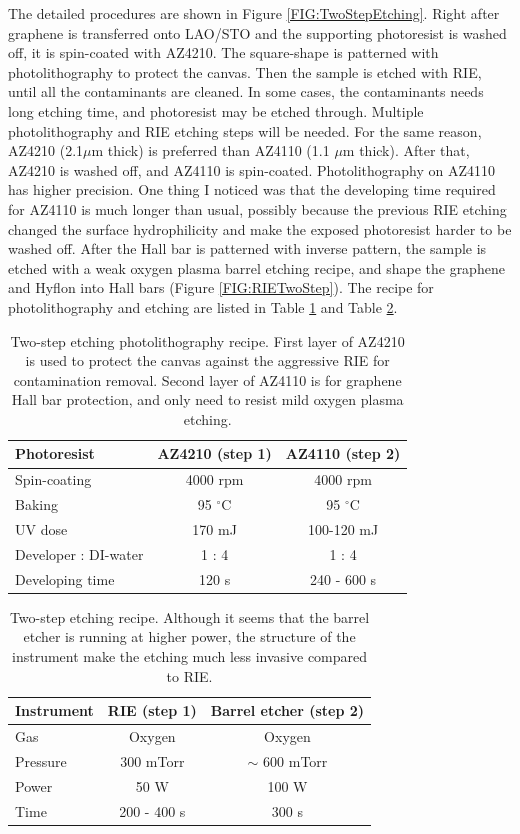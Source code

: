 \documentclass[pdflatex, sectionletters, 12pt]{pittetd}    %
\begin{document}
The detailed procedures are shown in Figure \ref{FIG:TwoStepEtching}. Right after graphene is transferred onto LAO/STO and the supporting photoresist is washed off, it is spin-coated with AZ4210. The square-shape is patterned with photolithography to protect the canvas. Then the sample is etched with RIE, until all the contaminants are cleaned. In some cases, the contaminants needs long etching time, and photoresist may be etched through. Multiple photolithography and RIE etching steps will be needed. For the same reason, AZ4210 (2.1$\mu$m thick) is preferred than AZ4110 (1.1 $\mu$m thick). After that, AZ4210 is washed off, and AZ4110 is spin-coated. Photolithography on AZ4110 has higher precision. One thing I noticed was that the developing time required for AZ4110 is much longer than usual, possibly because the previous RIE etching changed the surface hydrophilicity and make the exposed photoresist harder to be washed off. After the Hall bar is patterned with inverse pattern, the sample is etched with a weak oxygen plasma barrel etching recipe, and shape the graphene and Hyflon into Hall bars (Figure \ref{FIG:RIETwoStep}). The recipe for photolithography and etching are listed in Table \ref{TAB:TwoStepPL} and Table \ref{TAB:TwoStepEtching}.


\begin{table}
	\centering
	\begin{tabular}{l|cc}
		\hline
		Photoresist	& AZ4210 (step 1) & AZ4110 (step 2) \\ \hline
		Spin-coating	&	4000 rpm	&	4000 rpm \\ 
		Baking	&	95 $^{\circ}$C	&	95 $^{\circ}$C	\\ 
		UV dose	&	170 mJ	&	100-120 mJ	\\
		Developer : DI-water	&	1 : 4 &	1 : 4 \\ 
		Developing time	&	120 s	&	240 - 600 s \\
		\hline
	\end{tabular}
	\caption{Two-step etching photolithography recipe. First layer of AZ4210 is used to protect the canvas against the aggressive RIE for contamination removal. Second layer of AZ4110 is for graphene Hall bar protection, and only need to resist mild oxygen plasma etching.}
	\label{TAB:TwoStepPL}
\end{table}

\begin{table}
	\centering
	\begin{tabular}{l|cc}
		\hline
		Instrument	& RIE (step 1)	&	Barrel etcher (step 2) \\ \hline
		Gas	&	Oxygen &	Oxygen \\ 
		Pressure	&	300 mTorr	&	$\sim$ 600 mTorr \\
		Power	&	50 W	&	100 W \\
		Time	&	200 - 400 s &	300 s\\ \hline
	\end{tabular}
	\caption{Two-step etching recipe. Although it seems that the barrel etcher is running at higher power, the structure of the instrument make the etching much less invasive compared to RIE.}
	\label{TAB:TwoStepEtching}
\end{table}
\end{document}
